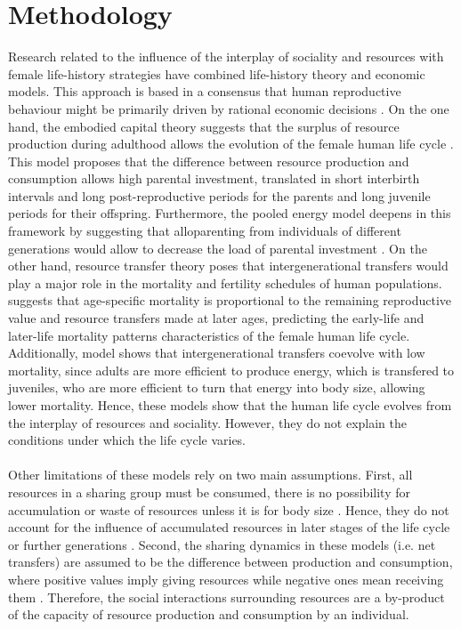 \documentclass{article}
\begin{document}
\begin{sidewaysfigure}
\begin{figure}[H]
    \label{fig:2}
\end{figure}
\end{sidewaysfigure}


\section{Methodology}

Research related to the influence of the interplay of sociality and resources with female life-history strategies have combined life-history theory and economic models. This approach is based in a consensus that human reproductive behaviour might be primarily driven by rational economic decisions \citep{jones2015resource}. On the one hand, the embodied capital theory suggests that the surplus of resource production during adulthood allows the evolution of the female human life cycle \citep{kaplan2000theory}. This model proposes that the difference between resource production and consumption allows high parental investment, translated in short interbirth intervals and long post-reproductive periods for the parents and long juvenile periods for their offspring. Furthermore, the pooled energy model deepens in this framework by suggesting that alloparenting from individuals of different generations would allow to decrease the load of parental investment \citep{kramer2010pooled}. On the other hand, resource transfer theory poses that intergenerational transfers would play a major role in the mortality and fertility schedules of human populations. \cite{lee2003rethinking} suggests that age-specific mortality is proportional to the remaining reproductive value and resource transfers made at later ages, predicting the early-life and later-life mortality patterns characteristics of the female human life cycle. Additionally, \cite{chu2006co} model shows that intergenerational transfers coevolve with low mortality, since adults are more efficient to produce energy, which is transfered to juveniles, who are more efficient to turn that energy into body size, allowing lower mortality. Hence, these models show that the human life cycle evolves from the interplay of resources and sociality. However, they do not explain the conditions under which the life cycle varies.
\\\\
Other limitations of these models rely on two main assumptions. First, all resources in a sharing group must be consumed, there is no possibility for accumulation or waste of resources \citep{lee2008sociality} unless it is for body size \citep{chu2006co,kaplan2003embodied}. Hence, they do not account for the influence of accumulated resources  in later stages of the life cycle or further generations \citep{goodman2012low}. Second, the sharing dynamics in these models (i.e. net transfers) are assumed to be the difference between production and consumption, where positive values imply giving resources while negative ones mean receiving them \citep{lee2003rethinking,lee2008sociality,chu2006co}. Therefore, the social interactions surrounding resources are a by-product of the capacity of resource production and consumption by an individual.
\end{document}
